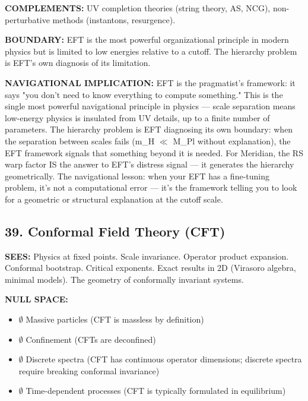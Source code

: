 \textbf{COMPLEMENTS:} UV completion theories (string theory, AS, NCG), non-perturbative methods (instantons, resurgence).


\textbf{BOUNDARY:} EFT is the most powerful organizational principle in modern physics but is limited to low energies relative to a cutoff. The hierarchy problem is EFT's own diagnosis of its limitation.


\textbf{NAVIGATIONAL IMPLICATION:} EFT is the pragmatist's framework: it says "you don't need to know everything to compute something." This is the single most powerful navigational principle in physics — scale separation means low-energy physics is insulated from UV details, up to a finite number of parameters. The hierarchy problem is EFT diagnosing its own boundary: when the separation between scales fails (m\_H $\ll$ M\_Pl without explanation), the EFT framework signals that something beyond it is needed. For Meridian, the RS warp factor IS the answer to EFT's distress signal — it generates the hierarchy geometrically. The navigational lesson: when your EFT has a fine-tuning problem, it's not a computational error — it's the framework telling you to look for a geometric or structural explanation at the cutoff scale.


\bigskip\noindent\makebox[\textwidth]{\color{rulegray}\rule{5cm}{0.3pt}}\bigskip


\subsection*{39. Conformal Field Theory (CFT)}


\textbf{SEES:} Physics at fixed points. Scale invariance. Operator product expansion. Conformal bootstrap. Critical exponents. Exact results in 2D (Virasoro algebra, minimal models). The geometry of conformally invariant systems.


\textbf{NULL SPACE:}

\begin{itemize}[nosep,leftmargin=*]
  \item $\emptyset$ Massive particles (CFT is massless by definition)
  \item $\emptyset$ Confinement (CFTs are deconfined)
  \item $\emptyset$ Discrete spectra (CFT has continuous operator dimensions; discrete spectra require breaking conformal invariance)
  \item $\emptyset$ Time-dependent processes (CFT is typically formulated in equilibrium)
\end{itemize}


